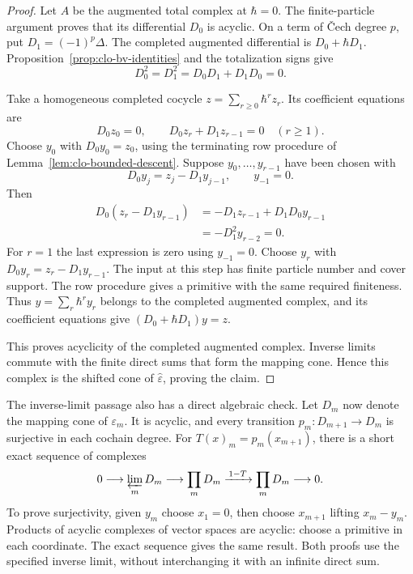 \begin{proof}
Let $A$ be the augmented total complex at $\hbar=0$.
The finite-particle argument proves that its differential $D_0$ is
acyclic. On a term of \v Cech degree $p$, put $D_1=(-1)^p\Delta$.
The completed augmented differential is $D_0+\hbar D_1$.
Proposition~\ref{prop:clo-bv-identities} and the totalization signs give
\[
 D_0^2=D_1^2=D_0D_1+D_1D_0=0.
\]

Take a homogeneous completed cocycle
$z=\sum_{r\geq0}\hbar^r z_r$.
Its coefficient equations are
\[
 D_0z_0=0,\qquad D_0z_r+D_1z_{r-1}=0\quad(r\geq1).
\]
Choose $y_0$ with $D_0y_0=z_0$, using the terminating row procedure
of Lemma~\ref{lem:clo-bounded-descent}.
Suppose $y_0,\ldots,y_{r-1}$ have been chosen with
\[
 D_0y_j=z_j-D_1y_{j-1},\qquad y_{-1}=0.
\]
Then
\[
 \begin{split}
 D_0(z_r-D_1y_{r-1})
 &=-D_1z_{r-1}+D_1D_0y_{r-1}\\
 &=-D_1^2y_{r-2}=0.
 \end{split}
\]
For $r=1$ the last expression is zero using $y_{-1}=0$.
Choose $y_r$ with $D_0y_r=z_r-D_1y_{r-1}$.
The input at this step has finite particle number and cover support.
The row procedure gives a primitive with the same required finiteness.
Thus $y=\sum_r\hbar^r y_r$ belongs to the completed augmented complex,
and its coefficient equations give $(D_0+\hbar D_1)y=z$.

This proves acyclicity of the completed augmented complex.
Inverse limits commute with the finite direct sums that form the
mapping cone. Hence this complex is the shifted cone of
$\widehat\varepsilon$, proving the claim.
\end{proof}

The inverse-limit passage also has a direct algebraic check.
Let $D_m$ now denote the mapping cone of $\varepsilon_m$.
It is acyclic, and every transition $p_m:D_{m+1}\to D_m$ is
surjective in each cochain degree. For $T(x)_m=p_m(x_{m+1})$, there is
a short exact sequence of complexes
\[
 0\longrightarrow\varprojlim_m D_m\longrightarrow\prod_mD_m
 \xrightarrow{\,1-T\,}\prod_mD_m\longrightarrow0.
\]
To prove surjectivity, given $y_m$ choose $x_1=0$, then choose
$x_{m+1}$ lifting $x_m-y_m$.
Products of acyclic complexes of vector spaces are acyclic: choose a
primitive in each coordinate. The exact sequence gives the same result.
Both proofs use the specified inverse limit, without interchanging it
with an infinite direct sum.

